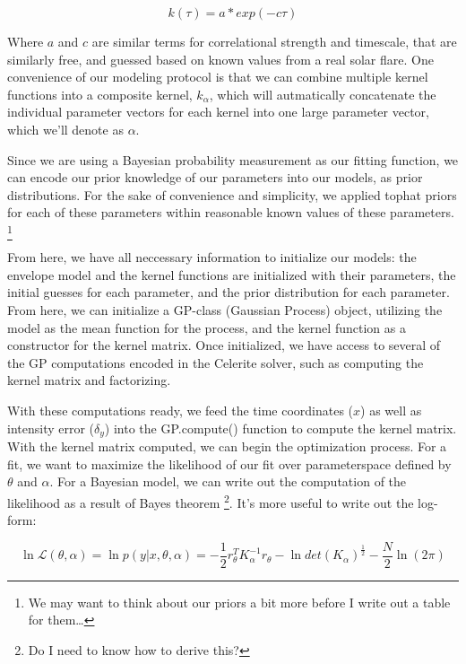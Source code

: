 \documentclass{aastex61}
\begin{document}
\begin{equation}
	k(\tau) = a * exp(-c\tau)
	\label{rednoise}
\end{equation}

Where $a$ and $c$ are similar terms for correlational strength and timescale, that are similarly free, and guessed based on known values from a real solar flare.
One convenience of our modeling protocol is that we can combine multiple kernel functions into a composite kernel, $k_\alpha$, which will autmatically concatenate the individual parameter vectors for each kernel into one large parameter vector, which we'll denote as $\alpha$.

Since we are using a Bayesian probability measurement as our fitting function, we can encode our prior knowledge of our parameters into our models, as prior distributions. 
For the sake of convenience and simplicity, we applied tophat priors for each of these parameters within reasonable known values of these parameters. 
\footnote{We may want to think about our priors a bit more before I write out a table for them\ldots}	


From here, we have all neccessary information to initialize our models: the envelope model and the kernel functions are initialized with their parameters, the initial guesses for each parameter, and the prior distribution for each parameter.
From here, we can initialize a GP-class (Gaussian Process) object, utilizing the model as the mean function for the process, and the kernel function as a constructor for the kernel matrix.
Once initialized, we have access to several of the GP computations encoded in the Celerite solver, such as computing the kernel matrix and factorizing.

With these computations ready, we feed the time coordinates ($x$) as well as intensity error ($\delta_y$) into the GP.compute() function to compute the kernel matrix.
With the kernel matrix computed, we can begin the optimization process. For a fit, we want to maximize the likelihood of our fit over parameterspace defined by $\theta$ and $\alpha$. 
For a Bayesian model, we can write out the computation of the likelihood as a result of Bayes theorem \footnote{Do I need to know how to derive this?}. It's more useful to write out the log-form:

\begin{equation}
	\ln \mathcal{L}(\theta, \alpha) = \ln p(y|x, \theta, \alpha) = -\frac{1}{2}r_\theta^T K_\alpha^{-1}r_\theta - \ln det(K_\alpha)^{\frac{1}{2}} - \frac{N}{2}\ln(2 \pi)
	\label{loglike}
\end{equation}
\end{document}
